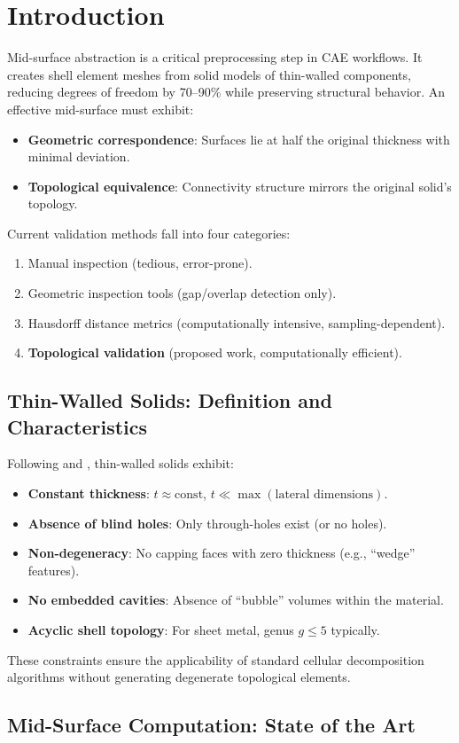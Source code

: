 \documentclass[conference]{IEEEtran}
\begin{document}
\section{Introduction}
Mid-surface abstraction is a critical preprocessing step in CAE workflows. It creates shell element meshes from solid models of thin-walled components, reducing degrees of freedom by 70--90\% while preserving structural behavior. An effective mid-surface must exhibit:
\begin{itemize}
\item \textbf{Geometric correspondence}: Surfaces lie at half the original thickness with minimal deviation.
\item \textbf{Topological equivalence}: Connectivity structure mirrors the original solid's topology.
\end{itemize}
Current validation methods fall into four categories:
\begin{enumerate}
\item Manual inspection (tedious, error-prone).
\item Geometric inspection tools (gap/overlap detection only).
\item Hausdorff distance metrics (computationally intensive, sampling-dependent).
\item \textbf{Topological validation} (proposed work, computationally efficient).
\end{enumerate} \subsection{Thin-Walled Solids: Definition and Characteristics}
Following \cite{Chen2006} and \cite{Woo2003}, thin-walled solids exhibit:
\begin{itemize}
\item \textbf{Constant thickness}: $t \approx \text{const}$, $t \ll \max(\text{lateral dimensions})$.
\item \textbf{Absence of blind holes}: Only through-holes exist (or no holes).
\item \textbf{Non-degeneracy}: No capping faces with zero thickness (e.g., ``wedge'' features). \item \textbf{No embedded cavities}: Absence of ``bubble'' volumes within the material.
\item \textbf{Acyclic shell topology}: For sheet metal, genus $g \le 5$ typically.
\end{itemize}
These constraints ensure the applicability of standard cellular decomposition algorithms without generating degenerate topological elements. \subsection{Mid-Surface Computation: State of the Art}
\end{document}
